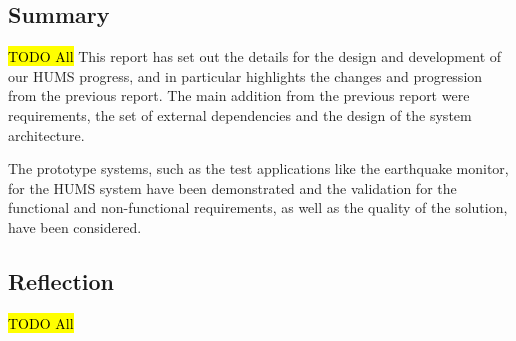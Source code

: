 \documentclass[10pt,a4paper]{article}
\begin{document}
\subsection{Summary}
\label{sec:summary}
\hl{TODO All}
This report has set out the details for the design and development of our HUMS progress, and in particular highlights the changes and progression from the previous report. The main addition from the previous report were requirements, the set of external dependencies and the design of the system architecture.

The prototype systems, such as the test applications like the earthquake monitor, for the HUMS system have been demonstrated and the validation for the functional and non-functional requirements, as well as the quality of the solution, have been considered.

\subsection{Reflection}
\label{sec:reflection}
\hl{TODO All}



\end{document}
